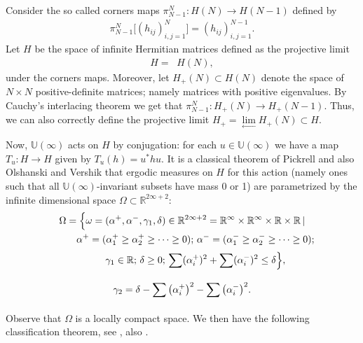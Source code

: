 \documentclass[pdftex]{sigma}
\numberwithin{equation}{section}
\begin{document}
Consider the so called corners maps $\pi^N_{N-1}\colon H(N)\to H(N-1)$ defined by
\begin{align}\label{Corners}
\pi_{N-1}^N\big[(h_{ij})_{i,j=1}^N\big]= (h_{ij} )_{i,j=1}^{N-1}.
\end{align}
Let $H$ be the space of infinite Hermitian matrices defined as the projective limit
\begin{gather*}
H=\mathop{\underset{\leftarrow}{\lim}}H(N),
\end{gather*}
under the corners maps. Moreover, let $H_+(N)\subset H(N)$ denote the space of $N \times N$ positive-definite matrices; namely matrices with positive eigenvalues. By Cauchy's interlacing theorem we get that $\pi^N_{N-1}\colon H_+(N)\to H_+(N-1)$. Thus, we can also correctly define the projective limit $H_+=\underset{\leftarrow}{\lim}H_+(N) \subset H$.

Now, $\mathbb{U}(\infty)$ acts on $H$ by conjugation: for each $u \in \mathbb{U}(\infty)$ we have a map $T_u\colon H \to H$ given by $T_u(h)=u^*hu$. It is a classical theorem of Pickrell \cite{Pickrell} and also Olshanski and Vershik \cite{OlshanskiVershik} that ergodic measures on $H$ for this action (namely ones such that all $\mathbb{U}(\infty)$-invariant subsets have mass 0 or 1) are parametrized by the infinite dimensional space $\Omega \subset \mathbb{R}^{2\infty+2}$:
\begin{gather}
\Omega =\Big\{\omega=(\alpha^+,\alpha^-,\gamma_1,\delta)\in \mathbb{R}^{2\infty+2}=\mathbb{R}^\infty \times \mathbb{R}^\infty \times \mathbb{R} \times \mathbb{R}\,|\nonumber\\
\hphantom{\Omega =\Big\{}{}\alpha^+ =(\alpha_1^+\ge \alpha_2^+\ge \cdots \ge 0) ; \, \alpha^-=(\alpha_1^-\ge \alpha_2^-\ge \cdots \ge 0);\nonumber\\
\hphantom{\Omega =\Big\{}{} \gamma_1 \in \mathbb{R} ;\, \delta \ge 0 ;\,\sum_{}^{}(\alpha_i^+)^2 + \sum_{}^{}(\alpha_i^-)^2\le \delta \Big\},\nonumber\\
 \gamma_2=\delta-\sum_{}^{}\big(\alpha_i^+\big)^2 - \sum_{}^{}\big(\alpha_i^-\big)^2.\label{Omegadefinition}
\end{gather}
Observe that $\Omega$ is a locally compact space. We then have the following classification theorem, see \cite{OlshanskiVershik,Pickrell}, also \cite{Defosseux}.
\end{document}
